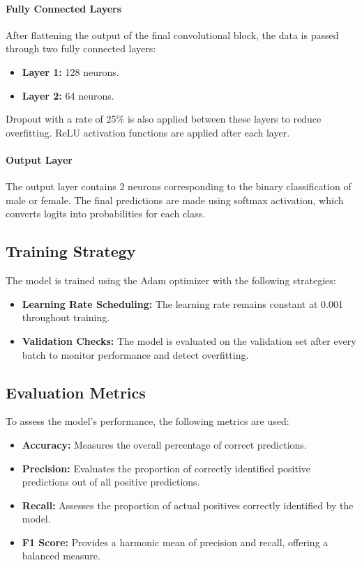 \paragraph{Fully Connected Layers}
After flattening the output of the final convolutional block, the data is passed through two fully connected layers:
\begin{itemize}
    \item \textbf{Layer 1:} 128 neurons.
    \item \textbf{Layer 2:} 64 neurons.
\end{itemize}

Dropout with a rate of 25\% is also applied between these layers to reduce overfitting. ReLU activation functions are applied after each layer.

\paragraph{Output Layer}
The output layer contains 2 neurons corresponding to the binary classification of male or female. The final predictions are made using softmax activation, which converts logits into probabilities for each class.

\subsection{Training Strategy}
The model is trained using the Adam optimizer with the following strategies:
\begin{itemize}
    \item \textbf{Learning Rate Scheduling:} The learning rate remains constant at 0.001 throughout training.
    \item \textbf{Validation Checks:} The model is evaluated on the validation set after every batch to monitor performance and detect overfitting.
\end{itemize}

\subsection{Evaluation Metrics}
To assess the model's performance, the following metrics are used:
\begin{itemize}
    \item \textbf{Accuracy:} Measures the overall percentage of correct predictions.
    \item \textbf{Precision:} Evaluates the proportion of correctly identified positive predictions out of all positive predictions.
    \item \textbf{Recall:} Assesses the proportion of actual positives correctly identified by the model.
    \item \textbf{F1 Score:} Provides a harmonic mean of precision and recall, offering a balanced measure.
\end{itemize}

